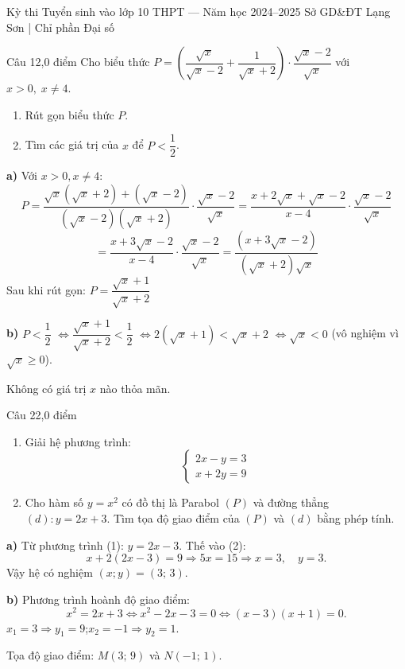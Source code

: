 ﻿%
%
  {Kỳ thi Tuyển sinh vào lớp 10 THPT — Năm học 2024--2025}%
  {Sở GD\&ĐT Lạng Sơn | Chỉ phần Đại số}

\begin{de_cau}{Câu 1}{2,0 điểm}
Cho biểu thức $P = \left(\dfrac{\sqrt{x}}{\sqrt{x}-2} + \dfrac{1}{\sqrt{x}+2}\right) \cdot \dfrac{\sqrt{x}-2}{\sqrt{x}}$
với $x > 0,\; x \neq 4$.
\begin{enumerate}[label=\alph*)]
\item Rút gọn biểu thức $P$.
\item Tìm các giá trị của $x$ để $P < \dfrac{1}{2}$.
\end{enumerate}
\end{de_cau}

\begin{loi_giai_cau}
\textbf{a)} Với $x>0, x\neq 4$:
\[P = \frac{\sqrt{x}(\sqrt{x}+2)+(\sqrt{x}-2)}{(\sqrt{x}-2)(\sqrt{x}+2)} \cdot \frac{\sqrt{x}-2}{\sqrt{x}}
= \frac{x+2\sqrt{x}+\sqrt{x}-2}{x-4} \cdot \frac{\sqrt{x}-2}{\sqrt{x}}\]
\[= \frac{x+3\sqrt{x}-2}{x-4}\cdot\frac{\sqrt{x}-2}{\sqrt{x}} = \frac{(x+3\sqrt{x}-2)}{(\sqrt{x}+2)\sqrt{x}}\]
Sau khi rút gọn: $\boxed{P = \dfrac{\sqrt{x}+1}{\sqrt{x}+2}}$

\textbf{b)} $P < \dfrac{1}{2}$
$\Leftrightarrow \dfrac{\sqrt{x}+1}{\sqrt{x}+2} < \dfrac{1}{2}$
$\Leftrightarrow 2(\sqrt{x}+1) < \sqrt{x}+2$
$\Leftrightarrow \sqrt{x} < 0$ (vô nghiệm vì $\sqrt{x}\geq 0$).

Không có giá trị $x$ nào thỏa mãn.
\end{loi_giai_cau}

\begin{de_cau}{Câu 2}{2,0 điểm}
\begin{enumerate}[label=\alph*)]
\item Giải hệ phương trình: 
\[ \begin{cases} 2x - y = 3 \\ x + 2y = 9 \end{cases} \]
\item Cho hàm số $y = x^2$ có đồ thị là Parabol $(P)$ và đường thẳng $(d)\colon y = 2x + 3$.
Tìm tọa độ giao điểm của $(P)$ và $(d)$ bằng phép tính.
\end{enumerate}
\end{de_cau}

\begin{loi_giai_cau}
\textbf{a)} Từ phương trình (1): $y = 2x-3$. Thế vào (2):
\[x + 2(2x-3) = 9 \Rightarrow 5x = 15 \Rightarrow x=3,\quad y = 3.\]
Vậy hệ có nghiệm $(x;y) = (3;\,3)$.

\textbf{b)} Phương trình hoành độ giao điểm:
\[x^2 = 2x+3 \Leftrightarrow x^2-2x-3=0 \Leftrightarrow (x-3)(x+1)=0.\]
$x_1 = 3 \Rightarrow y_1 = 9$;\quad $x_2 = -1 \Rightarrow y_2 = 1$.

Tọa độ giao điểm: $M(3;\,9)$ và $N(-1;\,1)$.
\end{loi_giai_cau}

